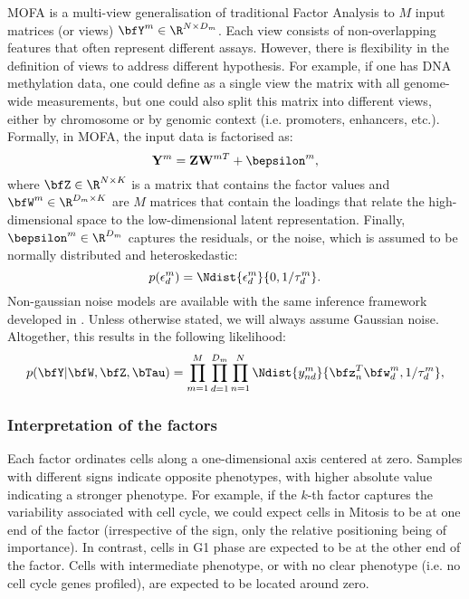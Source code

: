 MOFA is a multi-view generalisation of traditional Factor Analysis to $M$ input matrices (or views) $\bfY^m \in \R^{N \times D_m}$. Each view consists of non-overlapping features that often represent different assays. However, there is flexibility in the definition of views to address different hypothesis. For example, if one has DNA methylation data, one could define as a single view the matrix with all genome-wide measurements, but one could also split this matrix into different views, either by chromosome or by genomic context (i.e. promoters, enhancers, etc.).\\
Formally, in MOFA, the input data is factorised as:
\begin{equation}
	\mathbf{Y}^m = \mathbf{Z}\mathbf{W}^{mT} + \bepsilon^m,
\end{equation}
where  $\bfZ \in \R^{N \times K}$ is a matrix that contains the factor values and $\bfW^m \in \R^{D_m \times K}$ are $M$ matrices that contain the loadings that relate the high-dimensional space to the low-dimensional latent representation. Finally, $\bepsilon^m \in \R^{D_m}$ captures the residuals, or the noise, which is assumed to be normally distributed and heteroskedastic:
\begin{equation}
	p(\epsilon^m_d) = \Ndist{\epsilon^m_d}{0,1/\tau_d^m}.
\end{equation}
Non-gaussian noise models are available with the same inference framework developed in \cite{Argelaguet2018,Seeger2012,Jaakkola2000}. Unless otherwise stated, we will always assume Gaussian noise.\\
Altogether, this results in the following likelihood:
\begin{equation}
	p(\bfY|\bfW,\bfZ,\bTau) = \prod_{m=1}^{M} \prod_{d=1}^{D_m} \prod_{n=1}^{N} \Ndist{y_{nd}^m}{\bfz_{n}^T\bfw_{d}^{m},1/\tau_d^m},
\end{equation}

\subsubsection{Interpretation of the factors}
Each factor ordinates cells along a one-dimensional axis centered at zero. Samples with different signs indicate opposite phenotypes, with higher absolute value indicating a stronger phenotype. For example, if the $k$-th factor captures the variability associated with cell cycle, we could expect cells in Mitosis to be at one end of the factor (irrespective of the sign, only the relative positioning being of importance). In contrast, cells in G1 phase are expected to be at the other end of the factor. Cells with intermediate phenotype, or with no clear phenotype (i.e. no cell cycle genes profiled), are expected to be located around zero.

